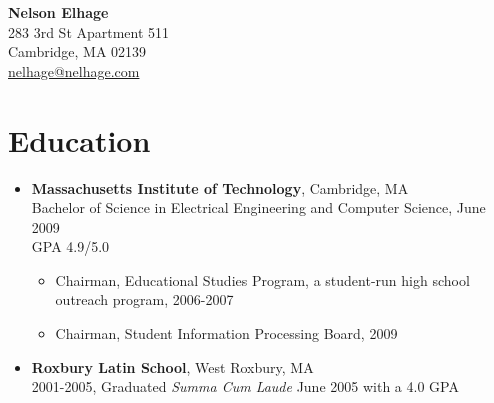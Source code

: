 \documentclass[letterpaper,10pt]{article}
\begin{document}
\begin{center}
  {\LARGE \bf Nelson Elhage}\\
  {\large
    283 3rd St Apartment 511 \\
    Cambridge, MA 02139 \\
    \mbox{\url{nelhage@nelhage.com}}}
\end{center}

\section*{Education}
\vspace*{-0.2cm}
\begin{itemize}
  \item \textbf{Massachusetts Institute of Technology}, Cambridge, MA
    \\ Bachelor of Science in Electrical
    Engineering and Computer Science, June 2009 \\
    GPA 4.9/5.0
    \vspace*{-0.2cm}
    \begin{itemize}
      \item Chairman, Educational Studies Program, a student-run
        high school outreach program, 2006-2007
      \item Chairman, Student Information Processing Board, 2009
    \end{itemize}
  \item \textbf{Roxbury Latin School}, West Roxbury, MA \\ 2001-2005,
    Graduated {\em Summa Cum Laude} June 2005 with a 4.0 GPA
\end{itemize}

\vspace*{-0.7cm}
\end{document}
